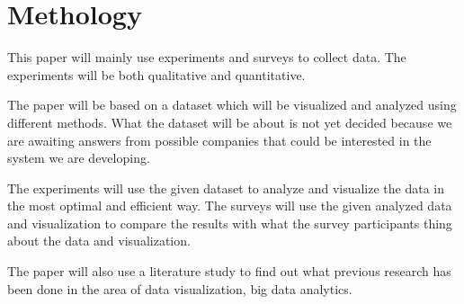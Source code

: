 \section{Methology}

This paper will mainly use experiments and surveys to collect data. 
The experiments will be both qualitative and quantitative.

The paper will be based on a dataset which will be visualized and analyzed
using different methods. What the dataset will be about is not yet decided 
because we are awaiting answers from possible companies that could 
be interested in the system we are developing.

The experiments will use the given dataset to analyze and visualize the
data in the most optimal and efficient way. The surveys will use 
the given analyzed data and visualization to compare the results with 
what the survey participants thing about the data and visualization.

The paper will also use a literature study to find out what previous 
research has been done in the area of data visualization, big data analytics.

